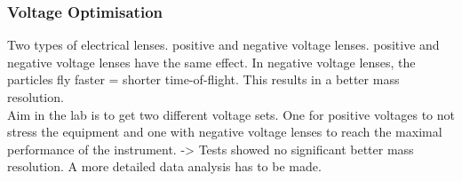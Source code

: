 	\subsubsection{Voltage Optimisation}
	Two types of electrical lenses. positive and negative voltage lenses. positive and negative voltage lenses have the same effect. In negative voltage lenses, the particles fly faster = shorter time-of-flight. This results in a better mass resolution.\\
	Aim in the lab is to get two different voltage sets. One for positive voltages to not stress the equipment and one with negative voltage lenses to reach the maximal performance of the instrument. -> Tests showed no significant better mass resolution. A more detailed data analysis has to be made. %
	
	
	
	
	
	